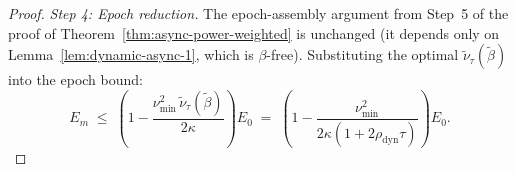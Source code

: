 \documentclass[pdflatex,sn-mathphys-num]{sn-jnl}%
\theoremstyle{thmstyleone}%
\theoremstyle{thmstyletwo}%
\theoremstyle{thmstylethree}%
\begin{document}
\begin{appendices}
\begin{proof}
\smallskip\noindent\textit{Step 4: Epoch reduction.} The epoch-assembly
argument from Step~5 of the proof of
Theorem~\ref{thm:async-power-weighted} is unchanged (it depends only on
Lemma~\ref{lem:dynamic-async-1}, which is $\beta$-free). Substituting
the optimal $\tilde\nu_\tau(\tilde\beta)$ into the epoch bound:
\[
E_m \;\leq\; \left(1 - \frac{\nu_{\min}^2\,\tilde\nu_\tau(\tilde\beta)}{2\kappa}\right) E_0 \;=\; \left(1 - \frac{\nu_{\min}^2}{2\kappa(1 + 2\rho_{\text{dyn}}\tau)}\right) E_0.
\]
\end{proof}

\end{appendices}



\end{document}

